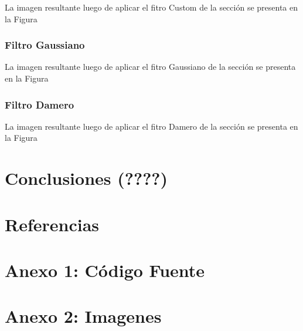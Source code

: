 \documentclass[twocolumn,a4paper,10pt]{article}
\begin{document}
La imagen resultante luego de aplicar el fitro Custom de la secci\'on
se presenta en la Figura 


\subsubsection{Filtro Gaussiano}
La imagen resultante luego de aplicar el fitro Gaussiano de la secci\'on
se presenta en la Figura 

\subsubsection{Filtro Damero}

La imagen resultante luego de aplicar el fitro Damero de la secci\'on 
se presenta en la Figura 

\section{Conclusiones (????)}

\section*{Referencias}

\begin{thebibliography}{99}
\end{thebibliography}

\newpage
\section*{Anexo 1: C\'odigo Fuente}

\newpage
\section*{Anexo 2: Imagenes}
\end{document}

